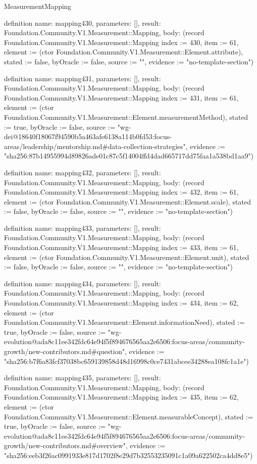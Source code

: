 \begin{lexlean}{MeasurementMapping}
\begin{semanticmodule}
definition{
  name: mapping430,
  parameters: [],
  result: Foundation.Community.V1.Measurement::Mapping,
  body: (record Foundation.Community.V1.Measurement::Mapping {index := 430, item := 61, element := (ctor Foundation.Community.V1.Measurement::Element.attribute), stated := false, byOracle := false, source := "", evidence := "no-template-section"})
}

definition{
  name: mapping431,
  parameters: [],
  result: Foundation.Community.V1.Measurement::Mapping,
  body: (record Foundation.Community.V1.Measurement::Mapping {index := 431, item := 61, element := (ctor Foundation.Community.V1.Measurement::Element.measurementMethod), stated := true, byOracle := false, source := "wg-dei@18640f18067f94590b5a463afe6138a114b0fd53:focus-areas/leadership/mentorship.md#data-collection-strategies", evidence := "sha256:87b14955994d89826ade01c87c5f14004ffd4dad665717dd75faa1a538bd1aa9"})
}

definition{
  name: mapping432,
  parameters: [],
  result: Foundation.Community.V1.Measurement::Mapping,
  body: (record Foundation.Community.V1.Measurement::Mapping {index := 432, item := 61, element := (ctor Foundation.Community.V1.Measurement::Element.scale), stated := false, byOracle := false, source := "", evidence := "no-template-section"})
}

definition{
  name: mapping433,
  parameters: [],
  result: Foundation.Community.V1.Measurement::Mapping,
  body: (record Foundation.Community.V1.Measurement::Mapping {index := 433, item := 61, element := (ctor Foundation.Community.V1.Measurement::Element.unit), stated := false, byOracle := false, source := "", evidence := "no-template-section"})
}

definition{
  name: mapping434,
  parameters: [],
  result: Foundation.Community.V1.Measurement::Mapping,
  body: (record Foundation.Community.V1.Measurement::Mapping {index := 434, item := 62, element := (ctor Foundation.Community.V1.Measurement::Element.informationNeed), stated := true, byOracle := false, source := "wg-evolution@ada8c11ee342fdc64e94f5f894676565aa2e6506:focus-areas/community-growth/new-contributors.md#question", evidence := "sha256:b7f6a83fcf37038bc659139858d48d16998c0ce7431abcee34288ea108fc1a1e"})
}

definition{
  name: mapping435,
  parameters: [],
  result: Foundation.Community.V1.Measurement::Mapping,
  body: (record Foundation.Community.V1.Measurement::Mapping {index := 435, item := 62, element := (ctor Foundation.Community.V1.Measurement::Element.measurableConcept), stated := true, byOracle := false, source := "wg-evolution@ada8c11ee342fdc64e94f5f894676565aa2e6506:focus-areas/community-growth/new-contributors.md#overview", evidence := "sha256:eeb3f26ac0991933e817d1702f8e29d7b32553235091c1a09a622502ca4dd8e5"})
}


\end{semanticmodule}
\end{lexlean}
